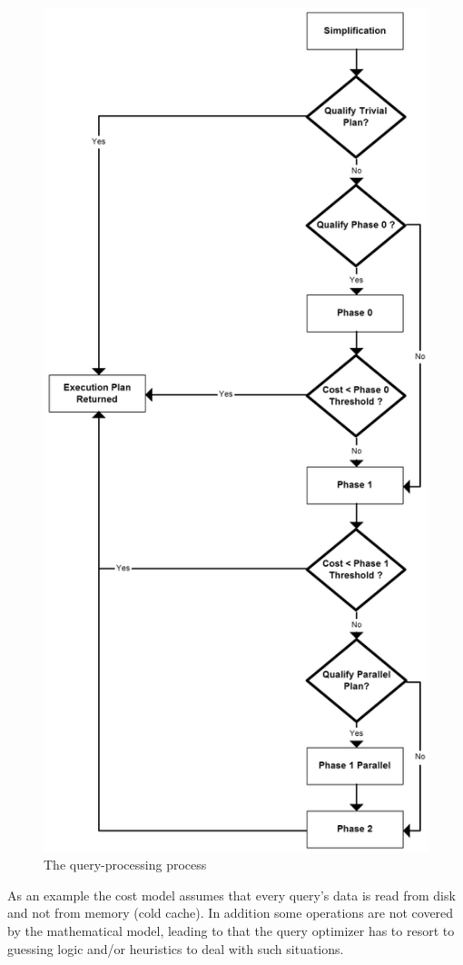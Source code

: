 \documentclass{cslthse-msc}
\begin{document}
\begin{figure}[H] 
\begin{center}
    \includegraphics[scale=0.3]{Pictures/Optimization-process.png}
  \end{center}
  \vspace{-20pt}
  \caption{The query-processing process}
  \label{fig:qpp}
  \vspace{-10pt}
\end{figure} 
\noindent As an example the cost model assumes that every query's data is read from disk and not from memory (cold cache). In addition some operations are not covered by the mathematical model, leading to that the query optimizer has to resort to guessing logic and/or heuristics to deal with such situations. 
\end{document}
